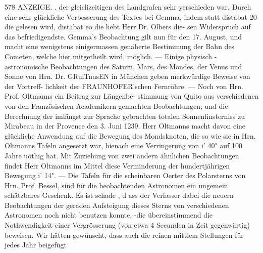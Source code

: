 \documentclass[12pt,a4paper]{article}
\begin{document}
\newpage
578 ANZEIGE. .\newline
der gleiclizeitigen des Landgrafen sehr yerschieden war. Durch eine sehr glückliche Verbesserung des\newline
Textes bei Gemma, indem statt distabat 20 die gelesen wird, distabat eo die hebt Herr Dr. Olbers die-\newline
sen Widerspruch auf das befriedigendste. Gemma's Beobachtung gilt nun für den 17. August, und macht\newline
eine wenigstens einigermassen genäherte Bestimmung der Bahn des Cometen, welche hier mitgetheilt\newline
wird, möglich. --- Einige physisch -astronomische Beobachtungen des Saturn, Mars, des Mondes, der\newline
Venus und Sonne von Hrn. Dr. GRuiTnusEN in München geben merkwürdige Beweise von der Vortreff-\newline
lichkeit der FRAUNHOFER'schen Fernröhre. --- Noch von Hrn. Prof. Oltmanns ein Beitrag zur Längenbe-\newline
stimmung von Quito aus verschiedenen von den Französischen Academikern gemachten Beobachtungen;\newline
und die Berechnung der imlängst zur Sprache gebrachten totalen Sonnenfinsterniss zu Mirabeau in der\newline
Provence den 3. Juni 1239. Herr Oltmanns macht davon eine glückliche Anwendung auf die Bewegung\newline
des Mondsknoten, die so wie sie in Hrn. Oltmanns Tafeln angesetzt war, hienach eine Verringerung\newline
von i' 40" auf 100 Jahre uöthig hat. Mit Zuziehung von zwei andern ähnlichen Beobachtungen findet\newline
Herr Oltmanns im Mittel diese Verminderung der hundertjährigen Bewegung i' 14". --- Die Tafeln für\newline
die scheinbaren Oerter des Polarsterns von Hrn. Prof. Bessel, sind für die beobachtenden Astronomen\newline
ein ungemein schätzbares Geschenk. Es ist schade , d ass der Verfasser dabei die neuern Beobachtungen\newline
der geraden Aufsteigung dieses Sterns von verschiedenen Astronomen noch nicht benutzen konnte, -die\newline
übereinstimmend die Nothwendigkeit einer Vergrösserung (von etwa 4 Secunden in Zeit gegenwärtig)\newline
beweisen. Wir hätten gewünscht, dass auch die reinen mittlem Stellungen für jedes Jahr beigefügt\newline
\end{document}

